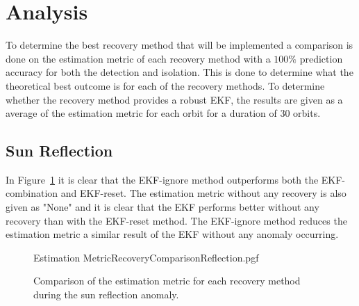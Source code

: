 \begin{itemize}
\end{itemize}

\section{Analysis}
To determine the best recovery method that will be implemented a comparison is done on the estimation metric of each recovery method with a $100\%$ prediction accuracy for both the detection and isolation. This is done to determine what the theoretical best outcome is for each of the recovery methods. To determine whether the recovery method provides a robust EKF, the results are given as a average of the estimation metric for each orbit for a duration of $30$ orbits.

\subsection{Sun Reflection}
 In Figure~\ref{fig:RecoveryComparisonReflection} it is clear that the EKF-ignore method outperforms both the EKF-combination and EKF-reset. The estimation metric without any recovery is also given as "None" and it is clear that the EKF performs better without any recovery than with the EKF-reset method. The EKF-ignore method reduces the estimation metric a similar result of the EKF without any anomaly occurring.
\begin{figure}[!htb]
	\centering
	\def\pgfwidth{7cm}
	{Estimation MetricRecoveryComparisonReflection.pgf}
	
	\caption{Comparison of the estimation metric for each recovery method during the sun reflection anomaly.}
	\label{fig:RecoveryComparisonReflection}
\end{figure}


